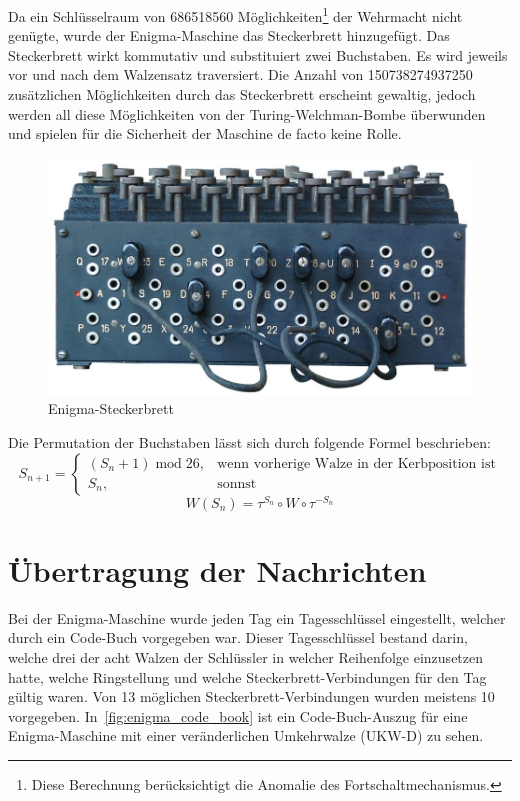 Da ein Schlüsselraum von \num{686518560} Möglichkeiten\footnote{Diese Berechnung berücksichtigt die Anomalie des Fortschaltmechanismus.\autocite{wiki:enigma}} der Wehrmacht nicht genügte, wurde der Enigma-Maschine das Steckerbrett hinzugefügt.
Das Steckerbrett wirkt kommutativ und substituiert zwei Buchstaben. 
Es wird jeweils vor und nach dem Walzensatz traversiert. 
Die Anzahl von \num{150738274937250}\autocite{wiki:enigma} zusätzlichen Möglichkeiten durch das Steckerbrett erscheint gewaltig, jedoch werden all diese Möglichkeiten von der Turing-Welchman-Bombe überwunden und spielen für die Sicherheit der Maschine de facto keine Rolle.

\begin{figure}[htbp]
	\centering
	\includegraphics[width=.4\linewidth]{Enigma/enigma-steckerbrett}
	\caption{Enigma-Steckerbrett\autocite{wiki:enigmasteckerbrett}}
	\label{fig:enigma_plugboard}
\end{figure}

Die Permutation der Buchstaben lässt sich durch folgende Formel beschrieben:
\[
	S_{n+1} = 
	\begin{cases}
		(S_n + 1)\; \mathrm{mod }\; 26, & \text{wenn vorherige Walze in der Kerbposition ist}\\
		S_n, & \text{sonnst}
	\end{cases}
\]
\[
	W(S_n) = \tau^{S_n} \circ W \circ \tau^{-S_n}
\]



\section{Übertragung der Nachrichten}\label{sec:uebertragung-der-nachrichten}
Bei der Enigma-Maschine wurde jeden Tag ein Tagesschlüssel eingestellt, welcher durch ein Code-Buch vorgegeben war.
Dieser Tagesschlüssel bestand darin, welche drei der acht Walzen der Schlüssler in welcher Reihenfolge einzusetzen hatte, welche Ringstellung und welche Steckerbrett-Verbindungen für den Tag gültig waren.
Von 13 möglichen Steckerbrett-Verbindungen wurden meistens 10 vorgegeben.
In~\cref{fig:enigma_code_book} ist ein Code-Buch-Auszug für eine Enigma-Maschine mit einer veränderlichen Umkehrwalze (UKW-D) zu sehen.

